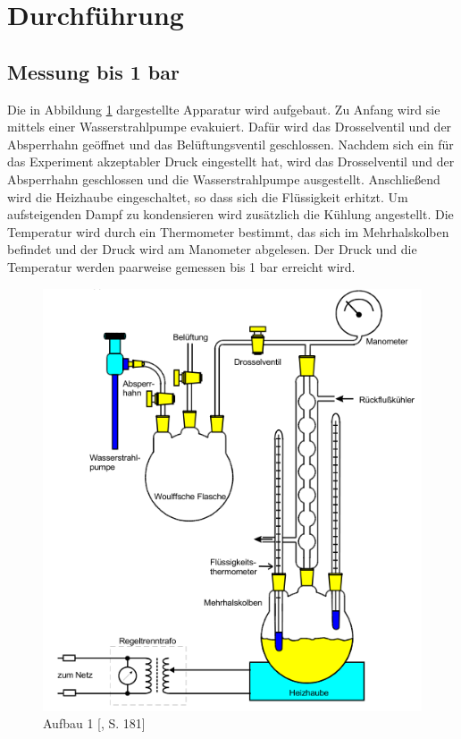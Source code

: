 \section{Durchführung}
\label{sec:Durchführung}

\subsection{Messung bis 1 bar}
Die in Abbildung \ref{fig:aufbau1} dargestellte Apparatur wird aufgebaut. Zu Anfang wird sie mittels einer Wasserstrahlpumpe evakuiert.
Dafür wird das Drosselventil und der Absperrhahn geöffnet und das Belüftungsventil geschlossen. Nachdem sich ein für das Experiment akzeptabler Druck eingestellt hat, wird das
Drosselventil und der Absperrhahn geschlossen und die Wasserstrahlpumpe ausgestellt. Anschließend wird die Heizhaube eingeschaltet, so dass sich die Flüssigkeit erhitzt. Um 
aufsteigenden Dampf zu kondensieren wird zusätzlich die Kühlung angestellt. Die Temperatur wird durch ein Thermometer bestimmt, das sich im Mehrhalskolben befindet und der Druck
wird am Manometer abgelesen. Der Druck und die Temperatur werden paarweise gemessen bis 1 bar erreicht wird.
\begin{figure}
    \centering
    \includegraphics{Aufbau1.png}
    \caption{Aufbau 1 [\cite{sample}, S. 181]}
    \label{fig:aufbau1}
\end{figure}


